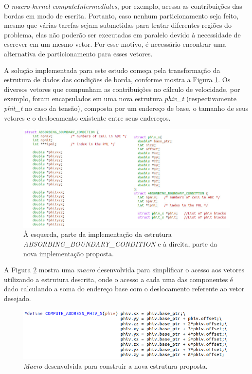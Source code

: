 \documentclass[cic,tc]{iiufrgs}
\begin{document}
O \textit{macro-kernel computeIntermediates}, por exemplo, acessa as contribuições das bordas em modo de escrita. Portanto, caso
nenhum particionamento seja feito, mesmo que várias tarefas sejam submetidas para tratar diferentes regiões do problema, elas
não poderão ser executadas em paralelo devido à necessidade de escrever em um mesmo vetor. Por esse motivo, é necessário encontrar
uma alternativa de particionamento para esses vetores.

A solução implementada para este estudo começa pela transformação da estrutura de dados das condições de borda, conforme mostra
a Figura \ref{fig:abc}. Os diversos vetores que compunham as contribuições no cálculo de velocidade, por exemplo, foram encapsulados
em uma nova estrutura \textit{phiv\_t} (respectivamente \textit{phit\_t} no caso da tensão), composta por um endereço de base, o
tamanho de seus vetores e o deslocamento existente entre seus endereços.

\begin{figure}[!htb]
  \caption{À esquerda, parte da implementação da estrutura \textit{ABSORBING\_BOUNDARY\_CONDITION} e à direita, parte da
  nova implementação proposta.}
    \begin{center} 
      \includegraphics[width=35em]{abc}
    \end{center}
    \label{fig:abc}
\end{figure}

A Figura \ref{fig:compute_address} mostra uma \textit{macro} desenvolvida para simplificar o acesso aos vetores utilizando a estrutura
descrita, onde o acesso a cada uma das componentes é dado calculando a soma do endereço base com o deslocamento referente ao vetor desejado.


\begin{figure}[!htb]
  \caption{\textit{Macro} desenvolvida para construir a nova estrutura proposta.}
    \begin{center} 
      \includegraphics[width=35em]{compute_address}
    \end{center}
    \label{fig:compute_address}
\end{figure}
\end{document}
